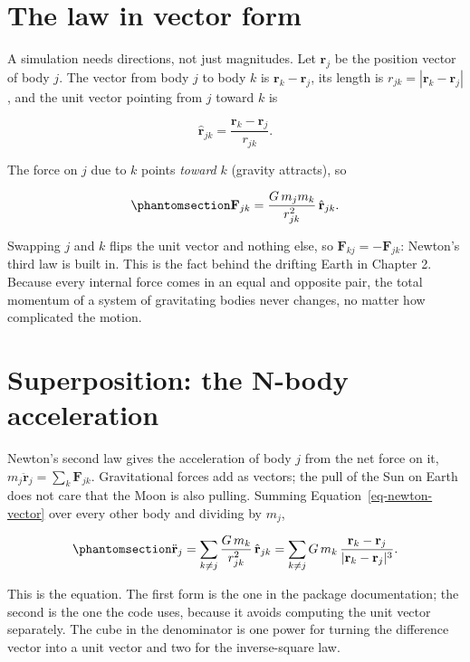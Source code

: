 \documentclass[
  10.5pt,
  letterpaper,
]{scrbook}
\theoremstyle{definition}
\theoremstyle{plain}
\theoremstyle{remark}
\begin{document}
\section{The law in vector form}\label{the-law-in-vector-form}

A simulation needs directions, not just magnitudes. Let \(\mathbf{r}_j\)
be the position vector of body \(j\). The vector from body \(j\) to body
\(k\) is \(\mathbf{r}_k - \mathbf{r}_j\), its length is
\(r_{jk} = |\mathbf{r}_k - \mathbf{r}_j|\), and the unit vector pointing
from \(j\) toward \(k\) is

\[
\hat{\mathbf{r}}_{jk} = \frac{\mathbf{r}_k - \mathbf{r}_j}{r_{jk}}.
\]

The force on \(j\) due to \(k\) points \emph{toward} \(k\) (gravity
attracts), so

\begin{equation}\protect\phantomsection\label{eq-newton-vector}{
\mathbf{F}_{jk} = \frac{G\,m_j m_k}{r_{jk}^2}\,\hat{\mathbf{r}}_{jk}.
}\end{equation}

Swapping \(j\) and \(k\) flips the unit vector and nothing else, so
\(\mathbf{F}_{kj} = -\mathbf{F}_{jk}\): Newton's third law is built in.
This is the fact behind the drifting Earth in Chapter 2. Because every
internal force comes in an equal and opposite pair, the total momentum
of a system of gravitating bodies never changes, no matter how
complicated the motion.

\section{Superposition: the N-body
acceleration}\label{superposition-the-n-body-acceleration}

Newton's second law gives the acceleration of body \(j\) from the net
force on it, \(m_j \ddot{\mathbf{r}}_j = \sum_k \mathbf{F}_{jk}\).
Gravitational forces add as vectors; the pull of the Sun on Earth does
not care that the Moon is also pulling. Summing
Equation~\ref{eq-newton-vector} over every other body and dividing by
\(m_j\),

\begin{equation}\protect\phantomsection\label{eq-nbody}{
\ddot{\mathbf{r}}_j = \sum_{k \neq j} \frac{G\,m_k}{r_{jk}^2}\,\hat{\mathbf{r}}_{jk}
= \sum_{k \neq j} G\,m_k\,\frac{\mathbf{r}_k - \mathbf{r}_j}{|\mathbf{r}_k - \mathbf{r}_j|^3}.
}\end{equation}

This is the equation. The first form is the one in the package
documentation; the second is the one the code uses, because it avoids
computing the unit vector separately. The cube in the denominator is one
power for turning the difference vector into a unit vector and two for
the inverse-square law.
\end{document}
